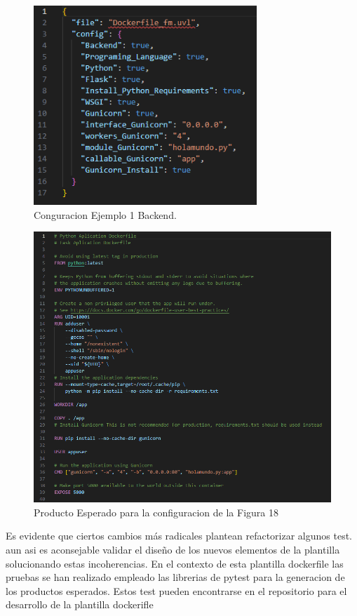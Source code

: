 \documentclass[12pt, a4paper, twoside]{article}
\begin{document}
\begin{figure}[h]
	\centering
	  \includegraphics[width=0.75\textwidth]{dockerfile.configuracion-backend.png}
	\caption{Conguracion Ejemplo 1 Backend.}
\end{figure}

\newpage 

\begin{figure}[h]
	\centering
	  \includegraphics[width=1\textwidth]{dockerfile.backend.producto.png}
	\caption{Producto Esperado para la configuracion de la Figura 18}
\end{figure}

Es evidente que ciertos cambios más radicales plantean refactorizar algunos test. aun asi es aconsejable validar el diseño de los nuevos elementos de la plantilla solucionando estas incoherencias.
En el contexto de esta plantilla dockerfile las pruebas se han realizado empleado las librerias de pytest \cite{pytest_docs} para la generacion de los productos esperados. Estos test pueden encontrarse en el repositorio para el desarrollo de la plantilla dockerifle \cite{dockerfile_template_dev}
\end{document}

